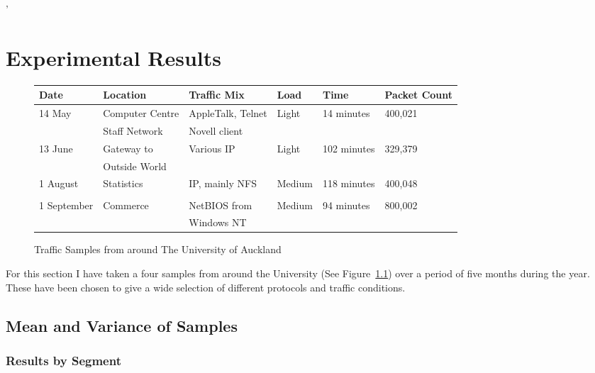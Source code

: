 '\chapter{Experimental Results}

\begin{figure}
{\small \begin{tabular}{|l|l|l|l|l|l|} \hline
Date & Location & Traffic Mix & Load & Time & Packet Count \\ \hline \hline
14 May & Computer Centre & AppleTalk, Telnet & Light & 14 minutes & 400,021 \\
 & Staff Network & Novell client & & & \\ \hline
13 June & Gateway to & Various IP & Light & 102 minutes & 329,379 \\
 & Outside World & & & & \\ \hline 
1 August & Statistics & IP, mainly NFS & Medium & 118 minutes & 400,048 \\
 & & & & & \\ \hline
1 September & Commerce & NetBIOS from & Medium & 94 minutes & 800,002 \\
 & & Windows NT & & & \\ \hline
\end{tabular}}
\caption{Traffic Samples from around The University of Auckland}
\label{trace:sampletable}
\end{figure}

For this section I have taken a four samples from around the
University (See Figure~\ref{trace:sampletable}) over a period of five
months during the year.  These have been chosen to give a wide
selection of different protocols and traffic conditions.

\section{Mean and Variance of Samples}

\subsection{Results by Segment}

